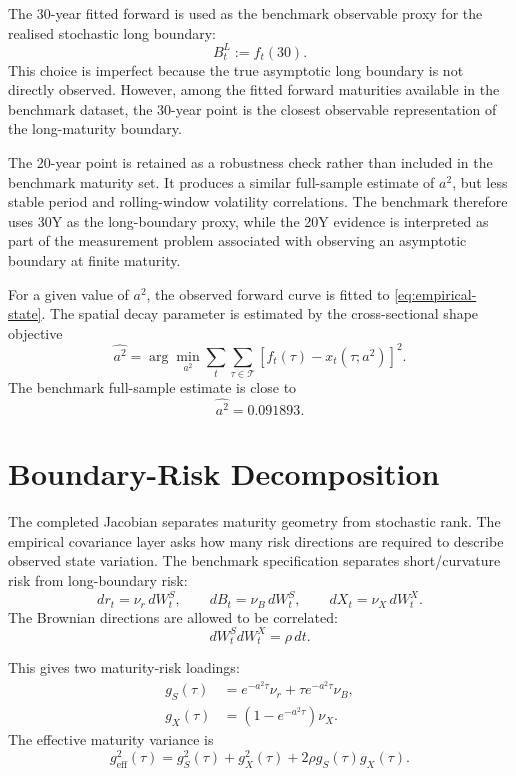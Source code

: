 \documentclass[11pt,oneside]{book}
\begin{document}
The 30-year fitted forward is used as the benchmark observable proxy for the realised stochastic long boundary:
\begin{equation}
B_t^L := f_t(30).
\label{eq:long-boundary-proxy}
\end{equation}
This choice is imperfect because the true asymptotic long boundary is not directly observed. However, among the fitted forward maturities available in the benchmark dataset, the 30-year point is the closest observable representation of the long-maturity boundary.

The 20-year point is retained as a robustness check rather than included in the benchmark maturity set. It produces a similar full-sample estimate of \(a^2\), but less stable period and rolling-window volatility correlations. The benchmark therefore uses 30Y as the long-boundary proxy, while the 20Y evidence is interpreted as part of the measurement problem associated with observing an asymptotic boundary at finite maturity.

For a given value of \(a^2\), the observed forward curve is fitted to \eqref{eq:empirical-state}. The spatial decay parameter is estimated by the cross-sectional shape objective
\begin{equation}
\widehat{a^2}
=
\arg\min_{a^2}
\sum_t
\sum_{\tau\in\mathcal{T}}
\left[
f_t(\tau)-x_t(\tau;a^2)
\right]^2.
\label{eq:a2-estimation}
\end{equation}
The benchmark full-sample estimate is close to
\[
\widehat{a^2}=0.091893.
\]

\section{Boundary-Risk Decomposition}

The completed Jacobian separates maturity geometry from stochastic rank. The empirical covariance layer asks how many risk directions are required to describe observed state variation. The benchmark specification separates short/curvature risk from long-boundary risk:
\begin{equation}
dr_t=\nu_r\,dW_t^S,\qquad
dB_t=\nu_B\,dW_t^S,\qquad
dX_t=\nu_X\,dW_t^X.
\label{eq:state-risk-decomposition}
\end{equation}
The Brownian directions are allowed to be correlated:
\begin{equation}
dW_t^S dW_t^X=\rho\,dt.
\label{eq:boundary-risk-correlation}
\end{equation}

This gives two maturity-risk loadings:
\begin{align}
g_S(\tau)
&=
e^{-a^2\tau}\nu_r
+
\tau e^{-a^2\tau}\nu_B,
\label{eq:short-risk-loading}
\\
g_X(\tau)
&=
\left(1-e^{-a^2\tau}\right)\nu_X.
\label{eq:long-risk-loading}
\end{align}
The effective maturity variance is
\begin{equation}
g_{\mathrm{eff}}^2(\tau)
=
g_S^2(\tau)
+
g_X^2(\tau)
+
2\rho g_S(\tau)g_X(\tau).
\label{eq:effective-volatility}
\end{equation}
\end{document}
